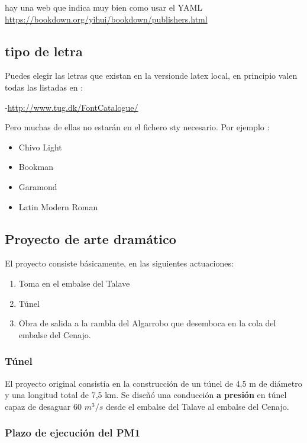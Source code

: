 \documentclass[10pt,spanish,a4paper,oneside]{article}
\providecommand{\tightlist}{%
  \setlength{\itemsep}{0pt}\setlength{\parskip}{0pt}}
\begin{document}
hay una web que indica muy bien como usar el YAML
\url{https://bookdown.org/yihui/bookdown/publishers.html}

\subsection{tipo de letra}\label{tipo-de-letra}

Puedes elegir las letras que existan en la versionde latex local, en
principio valen todas las listadas en :

-\url{http://www.tug.dk/FontCatalogue/}

Pero muchas de ellas no estarán en el fichero sty necesario. Por ejemplo
:

\begin{itemize}
\tightlist
\item
  Chivo Light
\item
  Bookman
\item
  Garamond
\item
  Latin Modern Roman
\end{itemize}

\subsection{Proyecto de arte
dramático}\label{proyecto-de-arte-dramatico}

El proyecto consiste básicamente, en las siguientes actuaciones:

\begin{enumerate}
\def\labelenumi{\arabic{enumi}.}
\tightlist
\item
  Toma en el embalse del Talave
\item
  Túnel
\item
  Obra de salida a la rambla del Algarrobo que desemboca en la cola del
  embalse del Cenajo.
\end{enumerate}

\subsubsection{Túnel}\label{tunel}

El proyecto original consistía en la construcción de un túnel de 4,5 m
de diámetro y una longitud total de 7,5 km. Se diseñó una conducción
\textbf{a presión} en túnel capaz de desaguar 60 \(m^3/s\) desde el
embalse del Talave al embalse del Cenajo.

\subsubsection{Plazo de ejecución del
PM1}\label{plazo-de-ejecucion-del-pm1}
\end{document}
